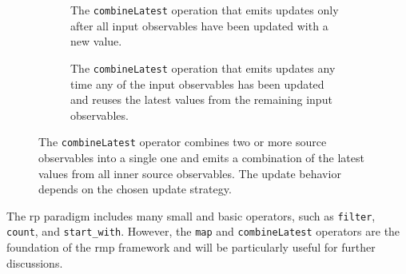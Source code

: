 
\begin{figure}
  \centering
  \hspace{\fill}%
  \begin{subfigure}[t]{.45\textwidth}
    \resizebox{\textwidth}{!}{}
    \caption{The \texttt{combineLatest} operation that emits updates only after all input observables have been updated with a new value.}
    \label{fig:rmp:reactive_operator_combine_latest_push_all}
  \end{subfigure}
  \hspace{\fill}%
  \begin{subfigure}[t]{.45\textwidth}
    \resizebox{\textwidth}{!}{}
    \caption{The \texttt{combineLatest} operation that emits updates any time any of the input observables has been updated and reuses the latest values from the remaining input observables.}
    \label{fig:rmp:reactive_operator_combine_latest_push_each}
  \end{subfigure}
  \hspace{\fill}%
  \caption{
    The \texttt{combineLatest} operator combines two or more source observables into a single one and emits a combination of the latest values from all inner source observables.
    The update behavior depends on the chosen update strategy.
  }
  \label{fig:rmp:reactive_operator_combine_latest}
\end{figure}

The \ac{rp} paradigm includes many small and basic operators, such as
\texttt{filter}, \texttt{count}, and \texttt{start\_with}.
However, the \texttt{map} and \texttt{combineLatest} operators are the foundation of the \ac{rmp}
framework and will be particularly useful for further discussions.

